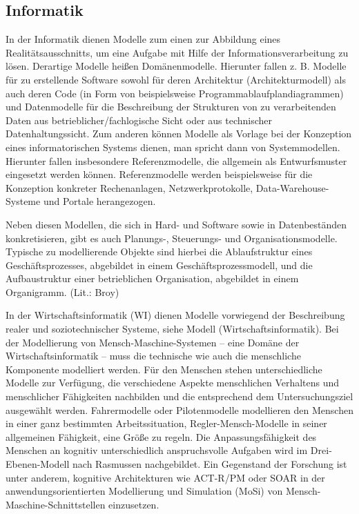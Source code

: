 \documentclass[a4paper, 12pt, pagesize]{scrartcl}
\begin{document}
\subsection{Informatik}
In der Informatik dienen Modelle zum einen zur Abbildung eines Realitätsausschnitts, um eine Aufgabe mit Hilfe der Informationsverarbeitung zu lösen. Derartige Modelle heißen Domänenmodelle. Hierunter fallen z. B. Modelle für zu erstellende Software sowohl für deren Architektur (Architekturmodell) als auch deren Code (in Form von beispielsweise Programmablaufplandiagrammen) und Datenmodelle für die Beschreibung der Strukturen von zu verarbeitenden Daten aus betrieblicher/fachlogische Sicht oder aus technischer Datenhaltungssicht. Zum anderen können Modelle als Vorlage bei der Konzeption eines informatorischen Systems dienen, man spricht dann von Systemmodellen. Hierunter fallen insbesondere Referenzmodelle, die allgemein als Entwurfsmuster eingesetzt werden können. Referenzmodelle werden beispielsweise für die Konzeption konkreter Rechenanlagen, Netzwerkprotokolle, Data-Warehouse-Systeme und Portale herangezogen.

Neben diesen Modellen, die sich in Hard- und Software sowie in Datenbeständen konkretisieren, gibt es auch Planungs-, Steuerungs- und Organisationsmodelle. Typische zu modellierende Objekte sind hierbei die Ablaufstruktur eines Geschäftsprozesses, abgebildet in einem Geschäftsprozessmodell, und die Aufbaustruktur einer betrieblichen Organisation, abgebildet in einem Organigramm. (Lit.: Broy)

In der Wirtschaftsinformatik (WI) dienen Modelle vorwiegend der Beschreibung realer und soziotechnischer Systeme, siehe Modell (Wirtschaftsinformatik). Bei der Modellierung von Mensch-Maschine-Systemen – eine Domäne der Wirtschaftsinformatik – muss die technische wie auch die menschliche Komponente modelliert werden. Für den Menschen stehen unterschiedliche Modelle zur Verfügung, die verschiedene Aspekte menschlichen Verhaltens und menschlicher Fähigkeiten nachbilden und die entsprechend dem Untersuchungsziel ausgewählt werden. Fahrermodelle oder Pilotenmodelle modellieren den Menschen in einer ganz bestimmten Arbeitssituation, Regler-Mensch-Modelle in seiner allgemeinen Fähigkeit, eine Größe zu regeln. Die Anpassungsfähigkeit des Menschen an kognitiv unterschiedlich anspruchsvolle Aufgaben wird im Drei-Ebenen-Modell nach Rasmussen nachgebildet. Ein Gegenstand der Forschung ist unter anderem, kognitive Architekturen wie ACT-R/PM oder SOAR in der anwendungsorientierten Modellierung und Simulation (MoSi) von Mensch-Maschine-Schnittstellen einzusetzen.
\end{document}
